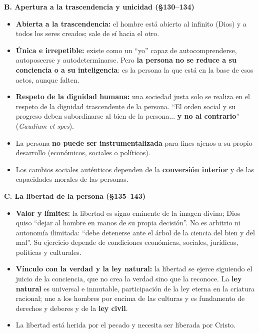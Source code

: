 \documentclass[10pt,a4paper]{article}
\begin{document}
\medskip\noindent \textbf{B. Apertura a la trascendencia y unicidad (\S{}130--134)}\par\nopagebreak
\begin{itemize}
\item \textbf{Abierta a la trascendencia:} el hombre está abierto al infinito (Dios) y a todos los seres creados; sale de sí hacia el otro.
\item \textbf{Única e irrepetible:} existe como un ``yo'' capaz de autocomprenderse, autoposeerse y autodeterminarse. Pero \textbf{la persona no se reduce a su conciencia o a su inteligencia}: es la persona la que está en la base de esos actos, aunque falten.
\item \textbf{Respeto de la dignidad humana:} una sociedad justa solo se realiza en el respeto de la dignidad trascendente de la persona. ``El orden social y su progreso deben subordinarse al bien de la persona... \textbf{y no al contrario}'' (\textit{Gaudium et spes}).
\item La persona \textbf{no puede ser instrumentalizada} para fines ajenos a su propio desarrollo (económicos, sociales o políticos).
\item Los cambios sociales auténticos dependen de la \textbf{conversión interior} y de las capacidades morales de las personas.
\end{itemize}

\medskip\noindent \textbf{C. La libertad de la persona (\S{}135--143)}\par\nopagebreak
\begin{itemize}
\item \textbf{Valor y límites:} la libertad es signo eminente de la imagen divina; Dios quiso ``dejar al hombre en manos de su propia decisión''. No es arbitrio ni autonomía ilimitada: ``debe detenerse ante el árbol de la ciencia del bien y del mal''. Su ejercicio depende de condiciones económicas, sociales, jurídicas, políticas y culturales.
\item \textbf{Vínculo con la verdad y la ley natural:} la libertad se ejerce siguiendo el juicio de la conciencia, que no crea la verdad sino que la reconoce. La \textbf{ley natural} es universal e inmutable, participación de la ley eterna en la criatura racional; une a los hombres por encima de las culturas y es fundamento de derechos y deberes y de la \textbf{ley civil}.
\item La libertad está herida por el pecado y necesita ser liberada por Cristo.
\end{itemize}
\end{document}
